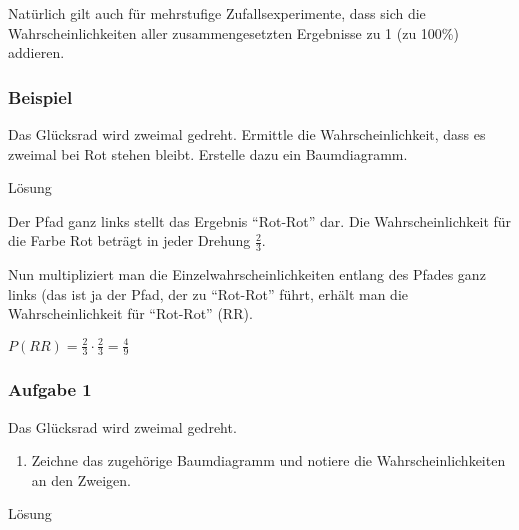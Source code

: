 \documentclass[
  ngerman,
]{book}
\providecommand{\tightlist}{%
  \setlength{\itemsep}{0pt}\setlength{\parskip}{0pt}}
\begin{document}
Natürlich gilt auch für mehrstufige Zufallsexperimente, dass sich die Wahrscheinlichkeiten aller zusammengesetzten Ergebnisse zu 1 (zu 100\%) addieren.

\hypertarget{beispiel}{%
\subsubsection*{Beispiel}\label{beispiel}}

Das Glücksrad wird zweimal gedreht. Ermittle die Wahrscheinlichkeit, dass es zweimal bei Rot stehen bleibt. Erstelle dazu ein Baumdiagramm.

Lösung

Der Pfad ganz links stellt das Ergebnis ``Rot-Rot'' dar. Die Wahrscheinlichkeit für die Farbe Rot beträgt in jeder Drehung \(\frac{2}{3}\).

Nun multipliziert man die Einzelwahrscheinlichkeiten entlang des Pfades ganz links (das ist ja der Pfad, der zu ``Rot-Rot'' führt, erhält man die Wahrscheinlichkeit für ``Rot-Rot'' (RR).

\(P(RR)=\frac{2}{3}\cdot\frac{2}{3}=\frac{4}{9}\)

\hypertarget{section-111}{%
\subsubsection*{}\label{section-111}}

\hypertarget{aufgabe-1-12}{%
\subsubsection*{Aufgabe 1}\label{aufgabe-1-12}}

Das Glücksrad wird zweimal gedreht.

\begin{enumerate}
\def\labelenumi{\alph{enumi})}
\tightlist
\item
  Zeichne das zugehörige Baumdiagramm und notiere die Wahrscheinlichkeiten an den Zweigen.
\end{enumerate}

Lösung

\hypertarget{section-112}{%
\subsubsection*{}\label{section-112}}
\end{document}

